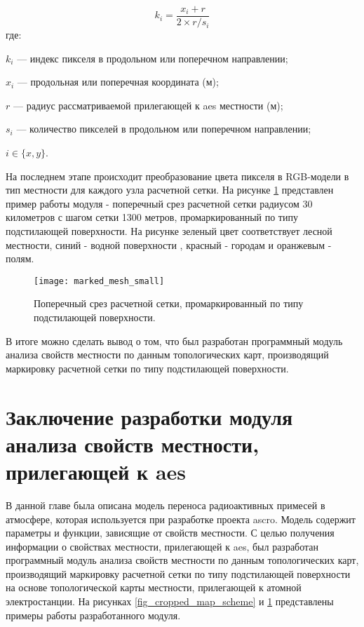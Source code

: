 \begin{equation}
    \label{eq_pix_to_coords}
    k_i = \frac{x_i+r}{2 \times r / s_i}    
\end{equation}
где:
\begin{description}
    \item $k_i$ --- индекс пикселя в продольном или поперечном направлении;
    \item $x_i$ --- продольная или поперечная координата (м);
    \item $r$ --- радиус рассматриваемой прилегающей к \ac{aes} местности (м);
    \item $s_i$ --- количество пикселей в продольном или поперечном направлении;
    \item $i \in \{x, y\}$.
\end{description}

На последнем этапе происходит преобразование цвета пикселя в RGB-модели в тип местности для каждого узла расчетной сетки. 
На рисунке \ref{fig_marked_mesh} представлен пример работы модуля - поперечный срез расчетной сетки радиусом 30 
километров с шагом сетки 1300 метров, промаркированный по типу подстилающей поверхности. На рисунке зеленый цвет 
соответствует лесной местности, синий - водной поверхности , красный - городам и оранжевым - полям. 

\begin{figure}[ht]
\centering
    \texttt{[image: marked\_mesh\_small]}
    \captionsetup{justification=centering}
    \caption{Поперечный срез расчетной сетки, промаркированный по типу подстилающей поверхности.}
    \label{fig_marked_mesh}
\end{figure}

В итоге можно сделать вывод о том, что был разработан программный модуль анализа свойств местности по данным 
топологических карт, производящий маркировку расчетной сетки по типу подстилающей поверхности.

\section{Заключение разработки модуля анализа свойств местности, прилегающей к \ac{aes}}

В данной главе была описана модель переноса радиоактивных примесей в атмосфере, которая используется при разработке 
проекта \ac{ascro}. Модель содержит параметры и функции, зависящие от свойств местности. С целью получения информации о 
свойствах местности, прилегающей к \ac{aes}, был разработан программный модуль анализа свойств местности по данным 
топологических карт, производящий маркировку расчетной сетки по типу подстилающей поверхности на основе топологической 
карты местности, прилегающей к атомной электростанции. На рисунках \ref{fig_cropped_map_scheme} и \ref{fig_marked_mesh} 
представлены примеры работы разработанного модуля.